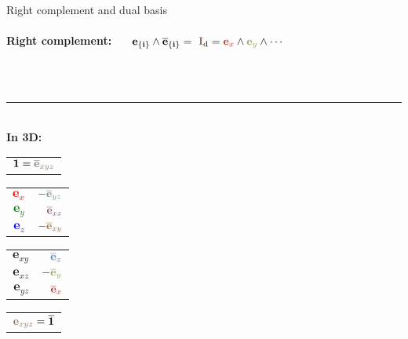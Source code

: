 \begin{frame}{Right complement and dual basis}
    ~\\~\\
    \textbf{Right complement:}~~~
    $\mathbf{e_{\{i\}} \wedge \mathbf{\overline{e}_{\{i\}}}} = ~ \textcolor{mixAll}{\mathbf{I}}_\mathrm{d}
        =\textcolor{red}{\mathbf{e}_{x}} \wedge
        \textcolor{green}{\mathbf{e}_{y}} \wedge
        \cdots$

    ~\\~\\
    \textcolor{gray}{\rule{\textwidth}{0.3pt}}
    ~\\
    \textbf{In 3D:}\\
    \begin{center}
        \begin{tabular}{c}
            $\mathbf{1} = \textcolor{mixAll}{\mathbf{\overline{e}}_{xyz}}$
        \end{tabular}
        \begin{tabular}{r@{=}r}
            \textcolor{red}{$\mathbf{e}_{x}$}   & $-\textcolor{midgreenblue}{\mathbf{\overline{e}}_{yz}}$ \\
            \textcolor{green}{$\mathbf{e}_{y}$} & $\textcolor{midredblue}{\mathbf{\overline{e}}_{xz}}$    \\
            \textcolor{blue}{$\mathbf{e}_{z}$}  & $-\textcolor{midredgreen}{\mathbf{\overline{e}}_{xy}}$  \\
        \end{tabular}
        \begin{tabular}{r@{=}r}
            \textcolor{midredgreen}{$\mathbf{e}_{xy}$}  & $\textcolor{blue}{\mathbf{\overline{e}}_{z}}$   \\
            \textcolor{midredblue}{$\mathbf{e}_{xz}$}   & $-\textcolor{green}{\mathbf{\overline{e}}_{y}}$ \\
            \textcolor{midgreenblue}{$\mathbf{e}_{yz}$} & $\textcolor{red}{\mathbf{\overline{e}}_{x}}$    \\
        \end{tabular}
        \begin{tabular}{c}
            $\textcolor{mixAll}{\mathbf{e}_{xyz}} = \mathbf{\overline{1}}$
        \end{tabular}
    \end{center}
\end{frame}



